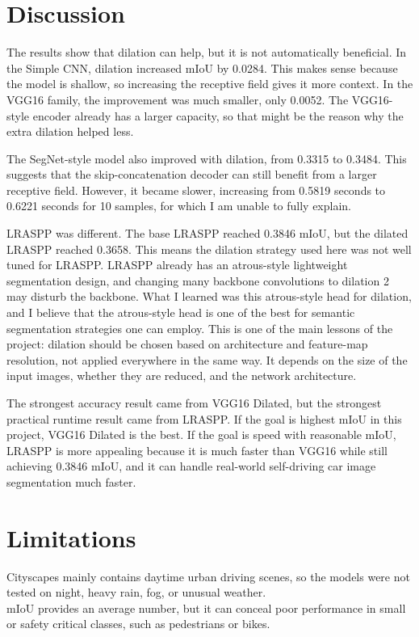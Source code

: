 \documentclass[12pt]{article}
\begin{document}
\clearpage

\section{Discussion}
The results show that dilation can help, but it is not automatically beneficial. In the Simple CNN, dilation increased mIoU by 0.0284. This makes sense because the model is shallow, so increasing the receptive field gives it more context. In the VGG16 family, the improvement was much smaller, only 0.0052. The VGG16-style encoder already has a larger capacity, so that might be the reason why the extra dilation helped less.

The SegNet-style model also improved with dilation, from 0.3315 to 0.3484. This suggests that the skip-concatenation decoder can still benefit from a larger receptive field. However, it became slower, increasing from 0.5819 seconds to 0.6221 seconds for 10 samples, for which I am unable to fully explain. 

LRASPP was different. The base LRASPP reached 0.3846 mIoU, but the dilated LRASPP reached 0.3658. This means the dilation strategy used here was not well tuned for LRASPP. LRASPP already has an atrous-style lightweight segmentation design, and changing many backbone convolutions to dilation 2 may disturb the backbone. What I learned was this atrous-style head for dilation, and I believe that the atrous-style head is one of the best for semantic segmentation strategies one can employ. This is one of the main lessons of the project: dilation should be chosen based on architecture and feature-map resolution, not applied everywhere in the same way. It depends on the size of the input images, whether they are reduced, and the network architecture.

The strongest accuracy result came from VGG16 Dilated, but the strongest practical runtime result came from LRASPP. If the goal is highest mIoU in this project, VGG16 Dilated is the best. If the goal is speed with reasonable mIoU, LRASPP is more appealing because it is much faster than VGG16 while still achieving 0.3846 mIoU, and it can handle real-world self-driving car image segmentation much faster.

\section{Limitations}
Cityscapes mainly contains daytime urban driving scenes, so the models were not tested on night, heavy rain, fog, or unusual weather.\\
mIoU provides an average number, but it can conceal poor performance in small or safety critical classes, such as pedestrians or bikes.
\end{document}
